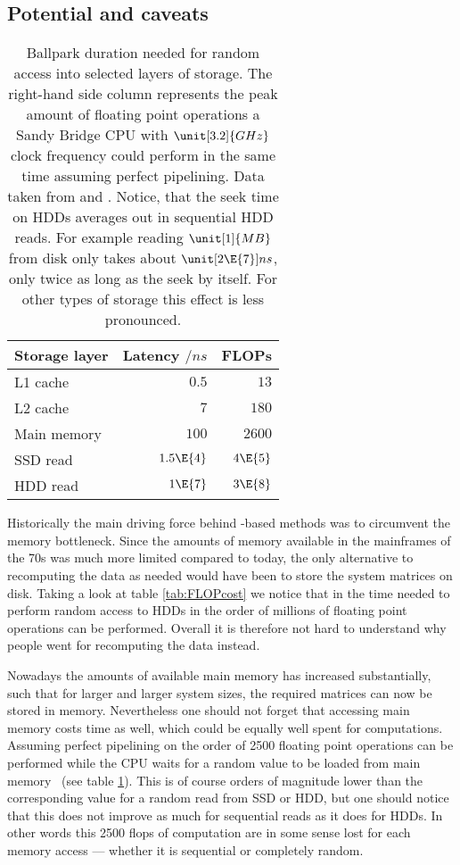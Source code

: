 \subsection{Potential and caveats}
\label{sec:ContractionPotentialCaveat}

\begin{table}
	\centering
	\begin{tabular}{lrr}
		\toprule
		Storage layer  & Latency $/\unit{ns}$ & FLOPs \\
		\midrule
		L1 cache       & $0.5$                &  $13$  \\
		L2 cache       & $7$                  &  $180$ \\
		Main memory    & $100$                &  $2600$ \\
		SSD read       & $1.5\E{4}$           &  $4\E{5}$ \\
		HDD read       & $1\E{7}$             &  $3\E{8}$ \\
		\bottomrule
	\end{tabular}
	\caption[Duration needed for random access into storage]{
		Ballpark duration needed for random access into selected
		layers of storage.
		The right-hand side column represents the peak amount
		of floating point operations a Sandy Bridge CPU with $\unit[3.2]{GHz}$
		clock frequency could perform in the same time
		assuming perfect pipelining.
		Data taken from \cite{CpuData} and \cite{LatencyWeb}.
		Notice, that the seek time on HDDs averages out
		in sequential HDD reads.
		For example reading $\unit[1]{MB}$ from disk only takes about $\unit[2\E{7}]{ns}$,
		\ie only twice as long as the seek by itself.
		For other types of storage this effect is less pronounced.
	}
	\label{tab:FLOPcost}
\end{table}

Historically the main driving force behind \contraction-based
methods was to circumvent the memory bottleneck.
Since the amounts of memory available in the mainframes of the 70s
was much more limited compared to today,
the only alternative to recomputing the data as needed
would have been to store the system matrices on disk.
Taking a look at table \vref{tab:FLOPcost}
we notice that in the time needed to perform random access to HDDs
in the order of millions of floating point operations can be performed.
Overall it is therefore not hard to understand why
people went for recomputing the data instead.

Nowadays the amounts of available main memory has increased substantially,
such that for larger and larger system sizes,
the required matrices can now be stored in memory.
Nevertheless one should not forget that accessing main memory costs time as well,
which could be equally well spent for computations.
Assuming perfect pipelining
on the order of 2500 floating point operations can be performed
while the CPU waits for a random value to be loaded from main memory%
~(see table \ref{tab:FLOPcost}).
This is of course orders of magnitude lower than the corresponding
value for a random read from SSD or HDD,
but one should notice that this does not improve as much for sequential
reads as it does for HDDs.
In other words this 2500 flops of computation are
in some sense lost for each memory access
--- whether it is sequential or completely random.


